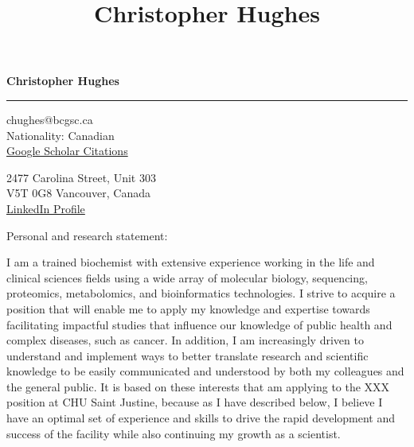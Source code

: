 \documentclass[11pt]{article}
\title{\bfseries\Huge Christopher Hughes}
\author{}
\date{}
\begin{document}
	\newpage
	\setcounter{page}{1}
	\noindent

\begin{LARGE}

	\noindent\textbf{Christopher Hughes}\vspace{1pt}

\end{LARGE}


\noindent\rule{\textwidth}{1pt}\vspace{9pt}

\noindent
\begin{minipage}{0.5\textwidth}
	\begin{flushleft}
		chughes@bcgsc.ca\\
		Nationality: Canadian\\ \href{https://scholar.google.com/citations?user=jPSwBGwAAAAJ}{Google Scholar Citations}
	\end{flushleft}
\end{minipage}%
\begin{minipage}{0.5\textwidth}
	\begin{flushright}
		2477 Carolina Street, Unit 303\\
		V5T 0G8 Vancouver, Canada\\ \href{https://www.linkedin.com/in/christopher-hughes-612460133/}{LinkedIn Profile}
	\end{flushright}
\end{minipage}\vspace{18pt}

\noindent
Personal and research statement:\vspace{12pt}

I am a trained biochemist with extensive experience working in the life and clinical sciences fields using a wide array of molecular biology, sequencing, proteomics, metabolomics, and bioinformatics technologies. I strive to acquire a position that will enable me to apply my knowledge and expertise towards facilitating impactful studies that influence our knowledge of public health and complex diseases, such as cancer. In addition, I am increasingly driven to understand and implement ways to better translate research and scientific knowledge to be easily communicated and understood by both my colleagues and the general public. It is based on these interests that am applying to the XXX position at CHU Saint Justine, because as I have described below, I believe I have an optimal set of experience and skills to drive the rapid development and success of the facility while also continuing my growth as a scientist.\\
\end{document}
